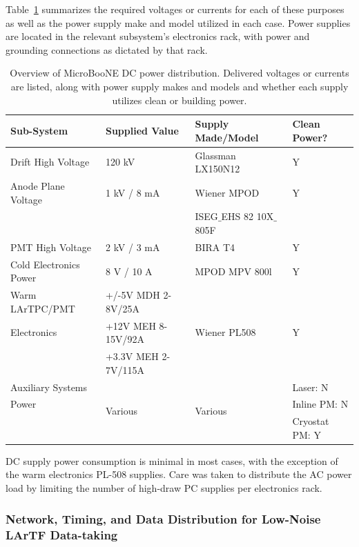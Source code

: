 Table~\ref{tab:DCPower} summarizes the required voltages or currents for each of these purposes as well as the power supply make and model utilized in each case.  Power supplies are located in the relevant subsystem's electronics rack, with power and grounding connections as dictated by that rack.

\begin{table}[!htb]
	\centering
	  \caption{Overview of MicroBooNE DC power distribution.  Delivered voltages or currents are listed, along with power supply makes and models and whether each supply utilizes clean or building power.}
    \begin{tabular}{|p{4.0cm}| p{4.0cm}| p{4.0cm} | p{2.5cm} | } \hline
      Sub-System & Supplied Value & Supply Made/Model & Clean Power? \\ \hline \hline
      Drift High Voltage & 120 kV & Glassman LX150N12 & Y \\ \hline
      Anode Plane Voltage & 1 kV / 8 mA & Wiener MPOD  & Y \\ 
      & & ISEG$\_$EHS 82 10X$\_$805F  &\\ \hline
      PMT High Voltage & 2 kV / 3 mA & BIRA T4 & Y \\ \hline
      Cold Electronics Power & 8 V / 10 A & MPOD MPV 800l & Y \\ \hline
      Warm LArTPC/PMT& +/-5V MDH 2-8V/25A& \multirow{3}{*}{Wiener PL508} & \multirow{3}{*}{Y}\\
       Electronics & +12V MEH 8-15V/92A & & \\ 
      & +3.3V MEH 2-7V/115A & & \\ \hline
       Auxiliary Systems & \multirow{3}{*}{Various} & \multirow{3}{*}{Various} & Laser: N \\
      Power &&& Inline PM: N \\
      &&& Cryostat PM: Y \\ \hline
  \end{tabular}
  \label{tab:DCPower}
\end{table}

DC supply power consumption is minimal in most cases, with the exception of the warm \lartpc electronics PL-508 supplies.  Care was taken to distribute the AC power load by limiting the number of high-draw PC supplies per electronics rack.

\subsubsection{Network, Timing, and Data Distribution for Low-Noise LArTF Data-taking}

